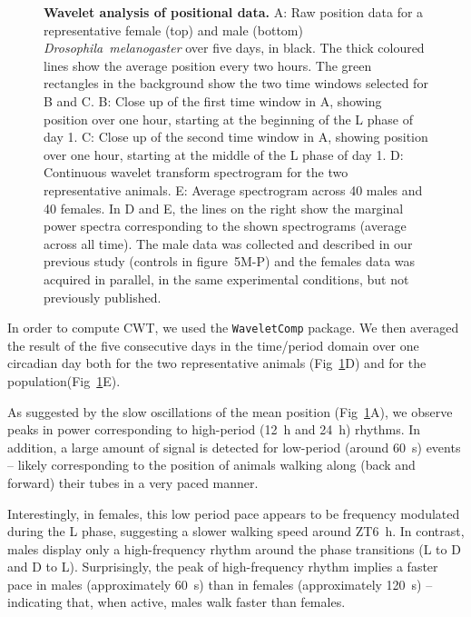 \documentclass[10pt,letterpaper]{article}\usepackage[]{graphicx}\usepackage[]{color}
\begin{document}
\begin{figure}[!h]
	\caption{{\bf Wavelet analysis of positional data.}
		A: Raw position data for a representative female (top) and male (bottom) \emph{Drosophila~melanogaster} over five days, in black. 
		The thick coloured lines show the average position every two hours.
		The green rectangles in the background show the two time windows selected for B and C.
		B: Close up of the first time window in A, showing position over one hour, starting at the beginning of the L phase of day 1.
		C: Close up of the second time window in A, showing position over one hour, starting at the middle of the L phase of day 1.
		D: Continuous wavelet transform spectrogram for the two representative animals.
		E: Average spectrogram across 40 males and 40 females.
		In D and E, the lines on the right show the marginal power spectra corresponding to the shown spectrograms (average across all time).
		The male data was collected and described in our previous study \cite{geissmann_ethoscopes_2017} (controls in figure~5M-P) and the females data was acquired in parallel, in the same experimental conditions, but not previously published.
	}
	\label{fig:fig-6}
\end{figure}



In order to compute CWT, we used the \texttt{WaveletComp} package\cite{schmidbauer_waveletcomp_2018}.
We then averaged the result of the five consecutive days in the time/period domain over one circadian day both for the two representative animals (Fig~\ref{fig:fig-6}D)
and for the population(Fig~\ref{fig:fig-6}E).

As suggested by the slow oscillations of the mean position (Fig~\ref{fig:fig-6}A), we observe peaks in power corresponding to high-period (12~h and 24~h) rhythms.
In addition, a large amount of signal is detected for low-period (around 60~s) events -- 
likely corresponding to the position of animals walking along (back and forward) their tubes in a very paced manner.

Interestingly, in females, this low period pace appears to be frequency modulated during the L phase, suggesting a slower walking speed around ZT6~h.
In contrast, males display only a high-frequency rhythm around the phase transitions (L to D and D to L).
Surprisingly, the peak of high-frequency rhythm implies a faster pace in males (approximately 60~s) than in females (approximately 120~s) --
indicating that, when active, males walk faster than females. 
\end{document}
